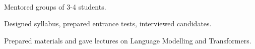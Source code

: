 


\\
\begin{zitemize}
    \item Mentored groups of 3-4 students.
    \item Designed syllabus, prepared entrance tests, interviewed candidates.
    \item Prepared materials and gave lectures on Language Modelling and Transformers.
\end{zitemize}